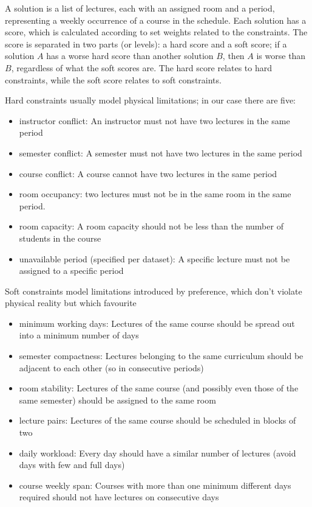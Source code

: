 \documentclass[12pt, a4paper, english]{report}
\def\bullet{\(\triangleright\)}
\begin{document}
A solution is a list of lectures, each with an assigned room and a period, representing a weekly occurrence of a course in the schedule. Each solution has a score, which is calculated according to set weights related to the constraints. The score is separated in two parts (or levels): a hard score and a soft score; if a solution \(A\) has a worse hard score than another solution \(B\), then \(A\) is worse than \(B\), regardless of what the soft scores are. The hard score relates to hard constraints, while the soft score relates to soft constraints.\par
Hard constraints usually model physical limitations; in our case there are five:
\begin{itemize}[label=\bullet]
\item instructor conflict: An instructor must not have two lectures in the same period
\item semester conflict: A semester must not have two lectures in the same period
\item course conflict: A course cannot have two lectures in the same period
\item room occupancy: two lectures must not be in the same room in the same period.
\item room capacity: A room capacity should not be less than the number of students in the course
\item unavailable period (specified per dataset): A specific lecture must not be assigned to a specific period
\end{itemize}

Soft constraints model limitations introduced by preference, which don't violate physical reality but which favourite 
\begin{itemize}[label=\bullet]
\item minimum working days: Lectures of the same course should be spread out into a minimum number of days
\item semester compactness: Lectures belonging to the same curriculum should be adjacent to each other (so in consecutive periods)
\item room stability: Lectures of the same course (and possibly even those of the same semester) should be assigned to the same room
\item lecture pairs: Lectures of the same course should be scheduled in blocks of two
\item daily workload: Every day should have a similar number of lectures (avoid days with few and full days)
\item course weekly span: Courses with more than one minimum different days required should not have lectures on consecutive days
\end{itemize}
\end{document}
